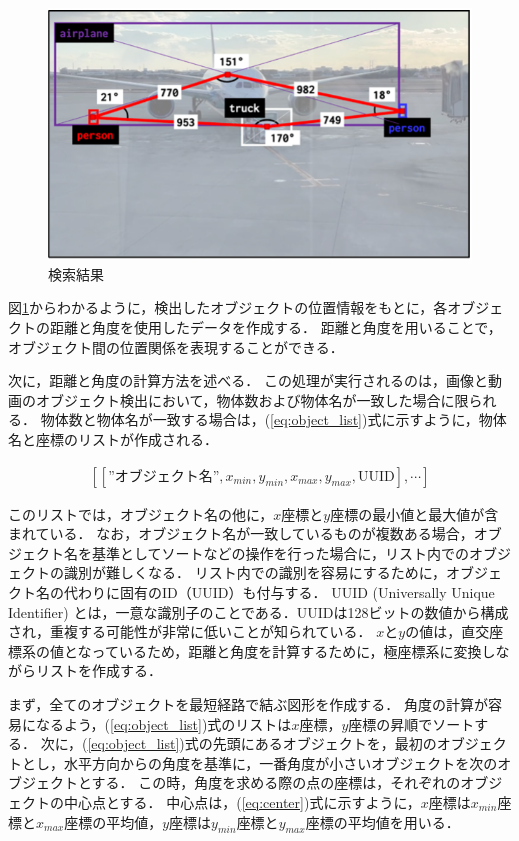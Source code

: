 \documentclass[a4j,12pt,dvipdfmx]{jreport}
\begin{document}
\begin{figure}[b]
  \centering
  \includegraphics[width=13cm]{image/object_relationship.png}
  \caption{検索結果}
  \label{fig:object_relationship}
\end{figure}

図\ref{fig:object_relationship}からわかるように，検出したオブジェクトの位置情報をもとに，各オブジェクトの距離と角度を使用したデータを作成する．
距離と角度を用いることで，オブジェクト間の位置関係を表現することができる．

次に，距離と角度の計算方法を述べる．
この処理が実行されるのは，画像と動画のオブジェクト検出において，物体数および物体名が一致した場合に限られる．
物体数と物体名が一致する場合は，(\ref{eq:object_list})式に示すように，物体名と座標のリストが作成される．

\begin{eqnarray}
  \label{eq:object_list}
  [[\text{”オブジェクト名”},x_{min},y_{min},x_{max},y_{max},\text{UUID}],\cdots]
\end{eqnarray}

このリストでは，オブジェクト名の他に，$x$座標と$y$座標の最小値と最大値が含まれている．
なお，オブジェクト名が一致しているものが複数ある場合，オブジェクト名を基準としてソートなどの操作を行った場合に，リスト内でのオブジェクトの識別が難しくなる．
リスト内での識別を容易にするために，オブジェクト名の代わりに固有のID（UUID）も付与する．
UUID (Universally Unique Identifier) とは，一意な識別子のことである．UUIDは128ビットの数値から構成され，重複する可能性が非常に低いことが知られている．
$x$と$y$の値は，直交座標系の値となっているため，距離と角度を計算するために，極座標系に変換しながらリストを作成する．

まず，全てのオブジェクトを最短経路で結ぶ図形を作成する．
角度の計算が容易になるよう，(\ref{eq:object_list})式のリストは$x$座標，$y$座標の昇順でソートする．
次に，(\ref{eq:object_list})式の先頭にあるオブジェクトを，最初のオブジェクトとし，水平方向からの角度を基準に，一番角度が小さいオブジェクトを次のオブジェクトとする．
この時，角度を求める際の点の座標は，それぞれのオブジェクトの中心点とする．
中心点は，(\ref{eq:center})式に示すように，$x$座標は$x_{min}$座標と$x_{max}$座標の平均値，$y$座標は$y_{min}$座標と$y_{max}$座標の平均値を用いる．
\end{document}
